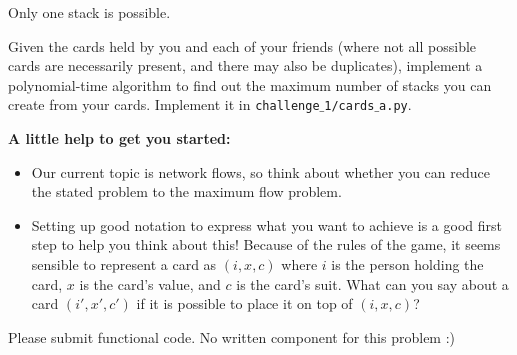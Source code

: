 \documentclass{hw}
\begin{document}
\begin{challenge}
Only one stack is possible.

Given the cards held by you and each of your friends (where not all possible cards are necessarily present, and there may also be duplicates), implement a polynomial-time algorithm to find out the maximum number of stacks you can create from your cards. Implement it in  \texttt{challenge$\_$1/cards$\_$a.py}.

\textbf{A little help to get you started:}
\begin{itemize}
    \item Our current topic is network flows, so think about whether you can reduce the stated problem to the maximum flow problem.
    \item Setting up good notation to express what you want to achieve is a good first step to help you think about this! Because of the rules of the game, it seems sensible to represent a card as \((i, x, c)\) where \(i\) is the person holding the card, \(x\) is the card’s value, and \(c\) is the card’s suit. What can you say about a card \((i', x', c')\) if it is possible to place it on top of \((i, x, c)\)?
\end{itemize}
\end{challenge}

\begin{solution}

Please submit functional code. No written component for this problem :)
\end{solution}
\end{document}
